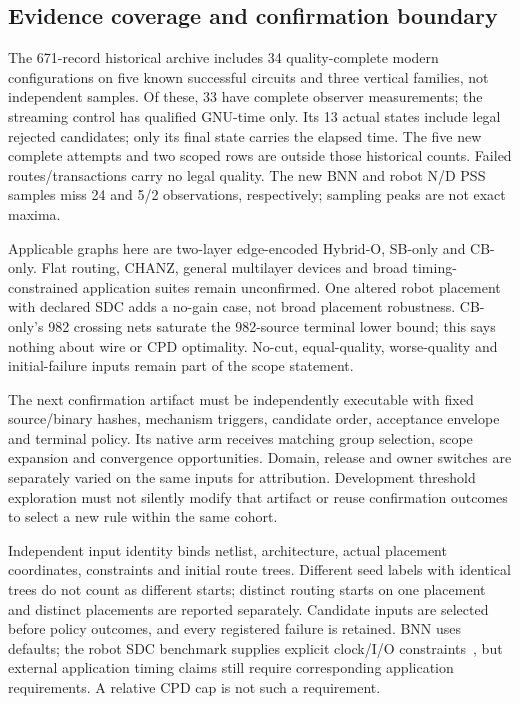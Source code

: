 \documentclass[conference,10pt]{IEEEtran}
\begin{document}
\subsection{Evidence coverage and confirmation boundary}
The 671-record historical archive includes 34 quality-complete modern configurations on five known successful circuits and three vertical families, not independent samples. Of these, 33 have complete observer measurements; the streaming control has qualified GNU-time only. Its 13 actual states include legal rejected candidates; only its final state carries the elapsed time. The five new complete attempts and two scoped rows are outside those historical counts. Failed routes/transactions carry no legal quality. The new BNN and robot N/D PSS samples miss 24 and 5/2 observations, respectively; sampling peaks are not exact maxima.

Applicable graphs here are two-layer edge-encoded Hybrid-O, SB-only and CB-only. Flat routing, CHANZ, general multilayer devices and broad timing-constrained application suites remain unconfirmed. One altered robot placement with declared SDC adds a no-gain case, not broad placement robustness. CB-only's 982 crossing nets saturate the 982-source terminal lower bound; this says nothing about wire or CPD optimality. No-cut, equal-quality, worse-quality and initial-failure inputs remain part of the scope statement.

The next confirmation artifact must be independently executable with fixed source/binary hashes, mechanism triggers, candidate order, acceptance envelope and terminal policy. Its native arm receives matching group selection, scope expansion and convergence opportunities. Domain, release and owner switches are separately varied on the same inputs for attribution. Development threshold exploration must not silently modify that artifact or reuse confirmation outcomes to select a new rule within the same cohort.

Independent input identity binds netlist, architecture, actual placement coordinates, constraints and initial route trees. Different seed labels with identical trees do not count as different starts; distinct routing starts on one placement and distinct placements are reported separately. Candidate inputs are selected before policy outcomes, and every registered failure is retained. BNN uses defaults; the robot SDC benchmark supplies explicit clock/I/O constraints~\cite{vprsdc}, but external application timing claims still require corresponding application requirements. A relative CPD cap is not such a requirement.
\end{document}
